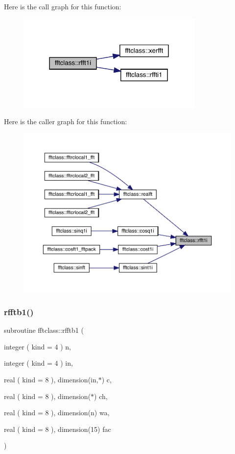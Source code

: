 Here is the call graph for this function\+:\nopagebreak
\begin{figure}[H]
\begin{center}
\leavevmode
\includegraphics[width=262pt]{namespacefftclass_abb3d8b6f0166090db98de3e7d627434f_cgraph}
\end{center}
\end{figure}
Here is the caller graph for this function\+:\nopagebreak
\begin{figure}[H]
\begin{center}
\leavevmode
\includegraphics[width=350pt]{namespacefftclass_abb3d8b6f0166090db98de3e7d627434f_icgraph}
\end{center}
\end{figure}
\mbox{\label{namespacefftclass_a338a7a4db13f2357c42a682142df3190}} 
\subsubsection{\texorpdfstring{rfftb1()}{rfftb1()}}
{\footnotesize\ttfamily subroutine fftclass\+::rfftb1 (\begin{DoxyParamCaption}\item[{integer ( kind = 4 )}]{n,  }\item[{integer ( kind = 4 )}]{in,  }\item[{real ( kind = 8 ), dimension(in,$\ast$)}]{c,  }\item[{real ( kind = 8 ), dimension($\ast$)}]{ch,  }\item[{real ( kind = 8 ), dimension(n)}]{wa,  }\item[{real ( kind = 8 ), dimension(15)}]{fac }\end{DoxyParamCaption})}

